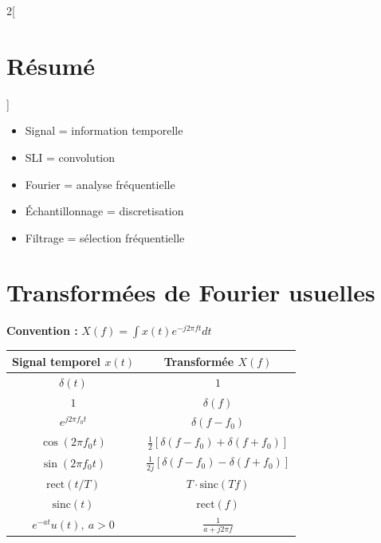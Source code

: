 \documentclass[a4paper,10pt]{article}
\begin{document}
    \begin{multicols}{2}[
    \section{Résumé}
    ]

    \begin{itemize}
        \item Signal = information temporelle
        \item SLI = convolution
        \item Fourier = analyse fréquentielle
        \item Échantillonnage = discretisation
        \item Filtrage = sélection fréquentielle
    \end{itemize}
    
    \end{multicols}

    \section{Transformées de Fourier usuelles}

    \textbf{Convention :} $X(f) = \int x(t)e^{-j2\pi ft}dt$

    \begin{center}
    \begin{tabular}{|c|c|}
    \hline
    \textbf{Signal temporel} $x(t)$ & \textbf{Transformée} $X(f)$ \\
    \hline

    $\delta(t)$ & $1$ \\
    \hline

    $1$ & $\delta(f)$ \\
    \hline

    $e^{j2\pi f_0 t}$ & $\delta(f - f_0)$ \\
    \hline

    $\cos(2\pi f_0 t)$ & $\frac{1}{2}\left[\delta(f - f_0) + \delta(f + f_0)\right]$ \\
    \hline

    $\sin(2\pi f_0 t)$ & $\frac{1}{2j}\left[\delta(f - f_0) - \delta(f + f_0)\right]$ \\
    \hline

    $\text{rect}(t/T)$ & $T \cdot \text{sinc}(Tf)$ \\
    \hline

    $\text{sinc}(t)$ & $\text{rect}(f)$ \\
    \hline

    $e^{-at}u(t),\ a>0$ & $\frac{1}{a + j2\pi f}$ \\
    \hline

    \end{tabular}
    \end{center}
\end{document}
